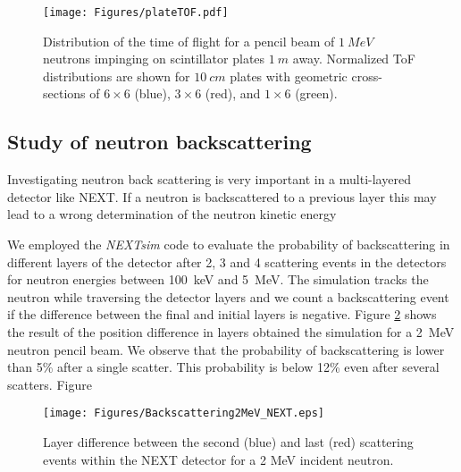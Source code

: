 \begin{figure}[tb]
\centering
\texttt{[image: Figures/plateTOF.pdf]}
\caption{Distribution of the time of flight for a pencil beam of $1~MeV$ neutrons impinging on scintillator plates $1~m$ away. Normalized ToF distributions are shown for $10~cm$ plates with geometric cross-sections of $6 \times 6$ (blue), $3 \times 6$ (red), and $1 \times 6$ (green).}
\label{fig:plateTOF}
\end{figure}

\subsection{Study of neutron backscattering}

Investigating neutron back scattering is very important in a multi-layered detector like NEXT. If a neutron is backscattered to a previous layer this may lead to a wrong determination  of the neutron kinetic energy 

We employed the \emph{NEXTsim} code to evaluate the probability of backscattering in different layers of the detector after 2, 3 and 4 scattering events in the detectors for neutron energies between 100~keV and 5~MeV. The simulation tracks the neutron while traversing the detector layers and we count a backscattering event if the difference between the final and initial layers is negative. Figure  \ref{fig:backscattering} shows the result of the position difference in layers obtained the simulation for a 2~MeV neutron pencil beam. We observe that the probability of backscattering is lower than 5\% after a single scatter. This probability is below 12\% even after several scatters. Figure  

\begin{figure}[tb]
\centering
\texttt{[image: Figures/Backscattering2MeV\_NEXT.eps]}
\caption{Layer difference between the second (blue) and last (red) scattering events within the NEXT detector for a 2 MeV incident neutron.}
\label{fig:backscattering}
\end{figure}


%
%
%




